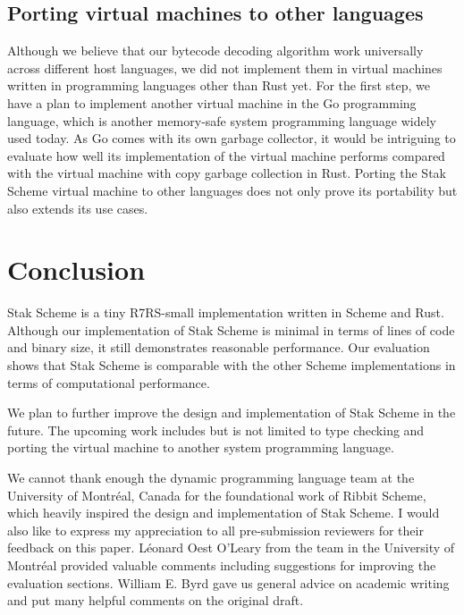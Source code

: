 \documentclass[sigplan]{acmart}
\begin{document}
\subsection{Porting virtual machines to other languages} \label{portvm}

Although we believe that our bytecode decoding algorithm work
universally across different host languages, we did not implement them in
virtual machines written in programming languages other than Rust yet.
For the first step, we have a plan to implement another virtual
machine in the Go programming language, which is another memory-safe system
programming language widely used today.
As Go comes with its own garbage collector,
it would be intriguing to evaluate how well its implementation of the
virtual machine performs compared with the virtual
machine with copy garbage collection in Rust.
Porting the Stak Scheme virtual machine to other languages does
not only prove its portability but also extends its use cases.

\section{Conclusion}

Stak Scheme is a tiny R7RS-small implementation written in Scheme and
Rust.
Although our implementation of Stak Scheme is minimal in terms of
lines of code and binary size, it still demonstrates reasonable performance.
Our evaluation shows that Stak Scheme is
comparable with the other Scheme implementations in terms of
computational performance.

We plan to further improve the design and implementation of Stak
Scheme in the future. The upcoming work includes but is not limited
to type checking and porting the virtual machine to
another system programming language.

\begin{acks}
  We cannot thank enough the dynamic programming language team at the
  University of Montréal, Canada for the foundational work of Ribbit
  Scheme, which heavily inspired the design and implementation of
  Stak Scheme.
  I would also like to express my appreciation to all pre-submission
  reviewers for their feedback on this paper.
  Léonard Oest O'Leary from the team in the University of Montréal provided
  valuable comments including suggestions for improving the
  evaluation sections.
  William E. Byrd gave us general advice on academic writing and put
  many helpful comments on the original draft.
\end{acks}



\end{document}
